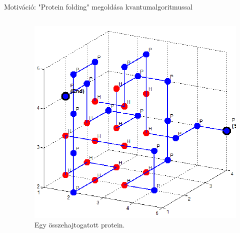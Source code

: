 \documentclass[aspectratio=169]{beamer}
\begin{document}
\begin{frame}{Motiváció: "Protein folding" megoldása kvantumalgoritmussal}
\begin{columns}
\begin{column}{0.55\textwidth}
\end{column}
\begin{column}{0.45\textwidth}
\vspace{-0.2cm}
\begin{figure}[H]
\center
\includegraphics[width=\textwidth]{./figures/Protein-folds-with-length-36-amino-acids-18-contacts.png}
\caption{Egy összehajtogatott protein.\footnotemark}
\end{figure}
\end{column}
\end{columns}


\end{frame}
\end{document}
